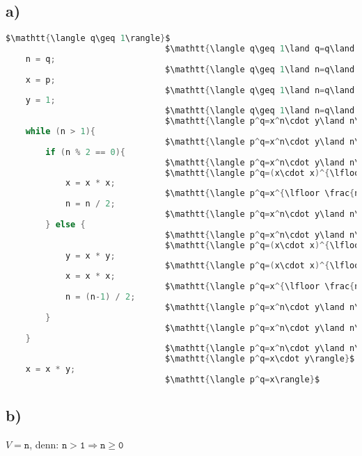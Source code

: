 \documentclass[a4paper,11pt]{scrartcl}
\begin{document}
\subsection*{a)}
	\begin{lstlisting}[mathescape=true, language=java]
								$\mathtt{\langle q\geq 1\rangle}$
								$\mathtt{\langle q\geq 1\land q=q\land x=p\land y=1\rangle}$
	n = q;
								$\mathtt{\langle q\geq 1\land n=q\land p=p\land y=1\rangle}$
	x = p;
								$\mathtt{\langle q\geq 1\land n=q\land x=p\land 1=1\rangle}$
	y = 1;
								$\mathtt{\langle q\geq 1\land n=q\land x=p\land y=1\rangle}$
								$\mathtt{\langle p^q=x^n\cdot y\land n\geq 1 \rangle}$
	while (n > 1){
								$\mathtt{\langle p^q=x^n\cdot y\land n\geq 1 \land n>1 \rangle}$	
		if (n % 2 == 0){
								$\mathtt{\langle p^q=x^n\cdot y\land n\geq 1 \land n>1 \land n\ mod\ 2=0\rangle}$				
								$\mathtt{\langle p^q=(x\cdot x)^{\lfloor \frac{n}{2} \rfloor}\cdot y\land \lfloor \frac{n}{2} \rfloor \geq 1 \rangle}$	
			x = x * x;
								$\mathtt{\langle p^q=x^{\lfloor \frac{n}{2} \rfloor}\cdot y\land \lfloor \frac{n}{2} \rfloor \geq 1 \rangle}$			
			n = n / 2;
								$\mathtt{\langle p^q=x^n\cdot y\land n\geq 1 \rangle}$			
		} else {
								$\mathtt{\langle p^q=x^n\cdot y\land n\geq 1 \land n>1 \land \neg (n\ mod\ 2=0)\rangle}$	
								$\mathtt{\langle p^q=(x\cdot x)^{\lfloor \frac{n-1}{2} \rfloor}\cdot (x\cdot y)\land \lfloor \frac{n-1}{2} \rfloor\geq 1\rangle}$			
			y = x * y;
								$\mathtt{\langle p^q=(x\cdot x)^{\lfloor \frac{n-1}{2} \rfloor}\cdot y\land \lfloor \frac{n-1}{2} \rfloor\geq 1\rangle}$			
			x = x * x;
								$\mathtt{\langle p^q=x^{\lfloor \frac{n-1}{2} \rfloor}\cdot y\land \lfloor \frac{n-1}{2} \rfloor\geq 1\rangle}$ 
			n = (n-1) / 2;
								$\mathtt{\langle p^q=x^n\cdot y\land n\geq 1\rangle}$		
		}	
								$\mathtt{\langle p^q=x^n\cdot y\land n\geq 1\rangle}$
	}
								$\mathtt{\langle p^q=x^n\cdot y\land n\geq 1 \land \neg (n>1)\rangle}$
								$\mathtt{\langle p^q=x\cdot y\rangle}$
	x = x * y;		
								$\mathtt{\langle p^q=x\rangle}$
	\end{lstlisting}

\subsection*{b)}

	$V = \mathtt{n}$, denn: $\mathtt{n>1\Longrightarrow n\geq 0}$
\end{document}
